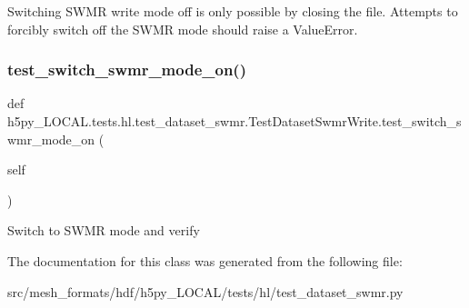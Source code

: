 \begin{DoxyVerb}Switching SWMR write mode off is only possible by closing the file.
Attempts to forcibly switch off the SWMR mode should raise a ValueError.
\end{DoxyVerb}
 \mbox{\label{classh5py__LOCAL_1_1tests_1_1hl_1_1test__dataset__swmr_1_1TestDatasetSwmrWrite_acf709a8fa723fe9c36faa5a628f3a0bf}} 
\subsubsection{\texorpdfstring{test\+\_\+switch\+\_\+swmr\+\_\+mode\+\_\+on()}{test\_switch\_swmr\_mode\_on()}}
{\footnotesize\ttfamily def h5py\+\_\+\+L\+O\+C\+A\+L.\+tests.\+hl.\+test\+\_\+dataset\+\_\+swmr.\+Test\+Dataset\+Swmr\+Write.\+test\+\_\+switch\+\_\+swmr\+\_\+mode\+\_\+on (\begin{DoxyParamCaption}\item[{}]{self }\end{DoxyParamCaption})}

\begin{DoxyVerb}Switch to SWMR mode and verify \end{DoxyVerb}
 

The documentation for this class was generated from the following file\+:\begin{DoxyCompactItemize}
\item 
src/mesh\+\_\+formats/hdf/h5py\+\_\+\+L\+O\+C\+A\+L/tests/hl/test\+\_\+dataset\+\_\+swmr.\+py\end{DoxyCompactItemize}
